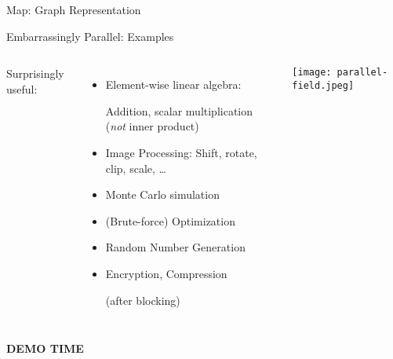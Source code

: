 \documentclass[english,compress]{beamer}
\def\bigncentered#1{
  \begin{center}
    \Huge\bfseries #1
  \end{center}
}
\begin{document}
\begin{frame}{Map: Graph Representation}
  \begin{center}
  \end{center}
\end{frame}
\begin{frame}{Embarrassingly Parallel: Examples}
  \begin{columns}
      Surprisingly useful:
      \begin{itemize}
        \item Element-wise linear algebra: 

          Addition, scalar
          multiplication (\emph{not} inner product)
        \item Image Processing: Shift, rotate, clip, scale, \dots
        \item Monte Carlo simulation
        \item (Brute-force) Optimization
        \item Random Number Generation
        \item Encryption, Compression

          (after blocking)
      \end{itemize}
      \texttt{[image: parallel-field.jpeg]}
  \end{columns}
\end{frame}
\begin{frame}
  \bigncentered{DEMO TIME}
\end{frame}
\end{document}
